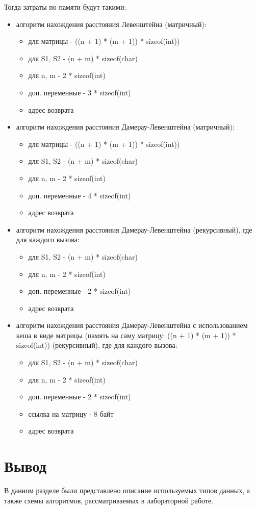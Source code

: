Тогда затраты по памяти будут такими:
\begin{itemize}
    \item алгоритм нахождения расстояния Левенштейна (матричный):

    \begin{itemize}
        \item для матрицы - ((n + 1) * (m + 1)) * sizeof(int))
        \item для S1, S2 - (n + m) * sizeof(char)
        \item для n, m - 2 * sizeof(int)
        \item доп. переменные - 3 * sizeof(int)
        \item адрес возврата
    \end{itemize}

    \item алгоритм нахождения расстояния Дамерау-Левенштейна (матричный):

    \begin{itemize}
        \item для матрицы - ((n + 1) * (m + 1)) * sizeof(int))
        \item для S1, S2 - (n + m) * sizeof(char)
        \item для n, m - 2 * sizeof(int)
        \item доп. переменные - 4 * sizeof(int)
        \item адрес возврата
    \end{itemize}

    \item алгоритм нахождения расстояния Дамерау-Левенштейна (рекурсивный), где для каждого вызова:

    \begin{itemize}
        \item для S1, S2 - (n + m) * sizeof(char)
        \item для n, m - 2 * sizeof(int)
        \item доп. переменные - 2 * sizeof(int)
        \item адрес возврата
    \end{itemize}

    \item алгоритм нахождения расстояния Дамерау-Левенштейна с использованием кеша в виде матрицы (память на саму матрицу: ((n + 1) * (m + 1)) * sizeof(int)) (рекурсивный), где для каждого вызова:

    \begin{itemize}
        \item для S1, S2 - (n + m) * sizeof(char)
        \item для n, m - 2 * sizeof(int)
        \item доп. переменные - 2 * sizeof(int)
        \item ссылка на матрицу - 8 байт
        \item адрес возврата
    \end{itemize}

\end{itemize}

\section{Вывод}
В данном разделе были представлено описание используемых типов данных, а также схемы алгоритмов, рассматриваемых в лабораторной работе.